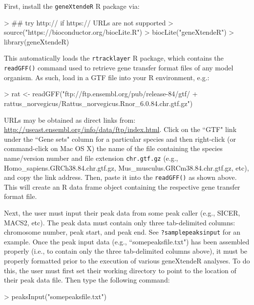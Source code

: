 \documentclass[12pt]{article}
\begin{document}
First, install the \texttt{geneXtendeR} R package via:

\begin{Schunk}
\begin{Sinput}
> ## try http:// if https:// URLs are not supported
> source("https://bioconductor.org/biocLite.R")
> biocLite("geneXtendeR")
> library(geneXtendeR)
\end{Sinput}
\end{Schunk}

This automatically loads the \texttt{rtracklayer} R package, which contains the \texttt{readGFF()} command used to retrieve gene transfer format files of any model organism.  As such, load in a GTF file into your R environment, e.g.:

\begin{Schunk}
\begin{Sinput}
> rat <- readGFF("ftp://ftp.ensembl.org/pub/release-84/gtf/
+                       rattus_norvegicus/Rattus_norvegicus.Rnor_6.0.84.chr.gtf.gz")
\end{Sinput}
\end{Schunk}

URLs may be obtained as direct links from: \url{http://useast.ensembl.org/info/data/ftp/index.html}.  Click on the ``GTF" link under the ``Gene sets" column for a particular species and then right-click (or command-click on Mac OS X) the name of the file containing the species name/version number and file extension \texttt{chr.gtf.gz} (e.g., Homo\_sapiens.GRCh38.84.chr.gtf.gz, Mus\_musculus.GRCm38.84.chr.gtf.gz, etc), and copy the link address.  Then, paste it into the \texttt{readGFF()} as shown above.  This will create an R data frame object containing the respective gene transfer format file.

Next, the user must input their peak data from some peak caller (e.g., SICER, MACS2, etc).  The peak data must contain only three tab-delimited columns: chromosome number, peak start, and peak end.  See \texttt{?samplepeaksinput} for an example.  Once the peak input data (e.g., ``somepeaksfile.txt") has been assembled properly (i.e., to contain only the three tab-delimited columns above), it must be properly formatted prior to the execution of various geneXtendeR analyses.  To do this, the user must first set their working directory to point to the location of their peak data file.  Then type the following command:

\begin{Schunk}
\begin{Sinput}
> peaksInput("somepeaksfile.txt")
\end{Sinput}
\end{Schunk}
\end{document}
